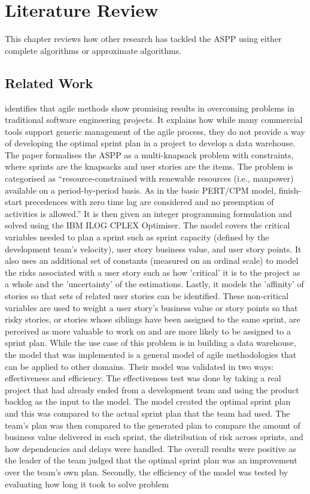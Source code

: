 
\chapter{Literature Review}
\label{ChapterLiteratureReview}

This chapter reviews how other research has tackled the ASPP using either complete algorithms or approximate algorithms.

\section{Related Work}

\citet{golfarelli2012sprint} identifies that agile methods show promising results in overcoming problems in traditional software engineering projects. It explains how while many commercial tools support generic management of the agile process, they do not provide a way of developing the optimal sprint plan in a project to develop a data warehouse. The paper formalises the ASPP as a multi-knapsack problem with constraints, where sprints are the knapsacks and user stories are the items. The problem is categorised as \enquote{resource-constrained with renewable resources (i.e., manpower) available on a period-by-period basis. As in the basic PERT/CPM model, finish-start precedences with zero time lag are considered and no preemption of activities is allowed.} It is then given an integer programming formulation and solved using the IBM ILOG CPLEX Optimiser. The model covers the critical variables needed to plan a sprint such as sprint capacity (defined by the development team's velocity), user story business value, and user story points. It also uses an additional set of constants (measured on an ordinal scale) to model the risks associated with a user story such as how 'critical' it is to the project as a whole and the 'uncertainty' of the estimations. Lastly, it models the 'affinity' of stories so that sets of related user stories can be identified. These non-critical variables are used to weight a user story's business value or story points so that risky stories, or stories whose siblings have been assigned to the same sprint, are perceived as more valuable to work on and are more likely to be assigned to a sprint plan. While the use case of this problem is in building a data warehouse, the model that was implemented is a general model of agile methodologies that can be applied to other domains. Their model was validated in two ways: effectiveness and efficiency. The effectiveness test was done by taking a real project that had already ended from a development team and using the product backlog as the input to the model. The model created the optimal sprint plan and this was compared to the actual sprint plan that the team had used. The team's plan was then compared to the generated plan to compare the amount of business value delivered in each sprint, the distribution of risk across sprints, and how dependencies and delays were handled. The overall results were positive as the leader of the team judged that the optimal sprint plan was an improvement over the team's own plan. Secondly, the efficiency of the model was tested by evaluating how long it took to solve problem 